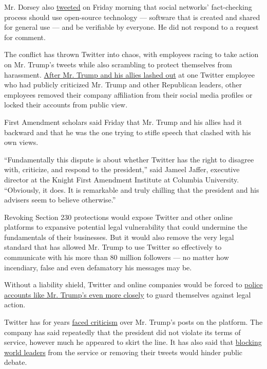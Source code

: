 Mr. Dorsey also
\href{https://twitter.com/jack/status/1266390510278569984}{tweeted} on
Friday morning that social networks' fact-checking process should use
open-source technology --- software that is created and shared for
general use --- and be verifiable by everyone. He did not respond to a
request for comment.

The conflict has thrown Twitter into chaos, with employees racing to
take action on Mr. Trump's tweets while also scrambling to protect
themselves from harassment.
\href{https://www.nytimes.com/2020/05/27/technology/trump-twitter.html}{After
Mr. Trump and his allies lashed out} at one Twitter employee who had
publicly criticized Mr. Trump and other Republican leaders, other
employees removed their company affiliation from their social media
profiles or locked their accounts from public view.

First Amendment scholars said Friday that Mr. Trump and his allies had
it backward and that he was the one trying to stifle speech that clashed
with his own views.

``Fundamentally this dispute is about whether Twitter has the right to
disagree with, criticize, and respond to the president,'' said Jameel
Jaffer, executive director at the Knight First Amendment Institute at
Columbia University. ``Obviously, it does. It is remarkable and truly
chilling that the president and his advisers seem to believe
otherwise.''

Revoking Section 230 protections would expose Twitter and other online
platforms to expansive potential legal vulnerability that could
undermine the fundamentals of their businesses. But it would also remove
the very legal standard that has allowed Mr. Trump to use Twitter so
effectively to communicate with his more than 80 million followers ---
no matter how incendiary, false and even defamatory his messages may be.

Without a liability shield, Twitter and online companies would be forced
to
\href{https://www.nytimes.com/2020/05/28/us/politics/trump-jack-dorsey.html}{police
accounts like Mr. Trump's even more closely} to guard themselves against
legal action.

Twitter has for years
\href{https://www.nytimes.com/2019/10/15/technology/trump-twitter-account.html}{faced
criticism} over Mr. Trump's posts on the platform. The company has said
repeatedly that the president did not violate its terms of service,
however much he appeared to skirt the line. It has also said that
\href{https://blog.twitter.com/en_us/topics/company/2018/world-leaders-and-twitter.html}{blocking
world leaders} from the service or removing their tweets would hinder
public debate.

